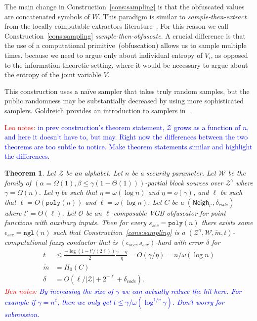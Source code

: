 \documentclass[11pt]{article}
\newcommand{\consref}[1]{\mbox{Construction~\ref{#1}}}
\newcommand{\class}[1]{{\ensuremath{\mathsf{#1}}}}
\newcommand{\neigh}{\ensuremath{\class{Neigh}}\xspace}
\newcommand{\poly}{\ensuremath{\mathtt{poly}}\xspace}
\newcommand{\ngl}{\ensuremath{\mathtt{ngl}}\xspace}
\newtheorem{theorem}{Theorem}[section]
\newcommand{\authnote}[2]{{\textcolor{red}{\textsf{#1 notes: }\textcolor{blue}{ #2}}\marginpar{\textcolor{red}{\textbf{!!!!!}}}}}
\newcommand{\authnote}[2]{}
\newcommand{\bnote}[1]{{\authnote{Ben}{#1}}}
\newcommand{\lnote}[1]{{\authnote{Leo}{#1}}}
\begin{document}
The main change in \consref{cons:sampling} is that the obfuscated values are concatenated symbols of $W$.  This paradigm is similar to \emph{sample-then-extract} from the locally computable extractors literature~\cite{lu2002hyper,vadhan2003constructing}.  For this reason we call \consref{cons:sampling} \emph{sample-then-obfuscate}.  A crucial difference is that the use of a computational primitive~(obfuscation) allows us to sample multiple times, because we need to argue only about individual entropy of $V_i$, as opposed to the information-theoretic setting, where it would be necessary to argue about the entropy of the joint variable $V$.

This construction uses a na\"{i}ve sampler that takes truly random samples, but the public randomness may be substantially decreased by using more sophisticated samplers. Goldreich provides an introduction to samplers in~\cite{goldreich2011sample}.

\lnote{in prev construction's theorem statement, $\mathcal{Z}$ grows as a function of $n$, and here it doesn't have to, but may. Right now the differences between the two theorems are too subtle to notice. Make theorem statements similar and highlight the differences.}
\begin{theorem}
\label{thm:sampling}
Let $\mathcal{Z}$ be an alphabet.
Let $n$ be a security parameter.
Let $\mathcal{W}$ be the family of $(\alpha = \Omega(1), \beta\leq \gamma(1-\Theta(1)))$-partial block sources over $\mathcal{Z}^\gamma$ where $\gamma = \Omega(n)$.   Let $\eta$ be such that $\eta = \omega(\log n)$ and $\eta = o(\gamma)$,  and $\ell$ be such that $\ell = O(\poly(n))$ and
$\ell = \omega(\log n)$.  Let $C$ be a $(\neigh_{t'}, \delta_{code})$ where $t' = \Theta(\ell)$.
Let $\mathcal{O}$ be an $\ell$-composable VGB obfuscator for point functions with auxiliary inputs. 
  Then for every $s_{sec} = \poly(n)$ there exists some $\epsilon_{sec} = \ngl(n)$ such that \consref{cons:sampling} is a $(\mathcal{Z}^\gamma, \mathcal{W}, \tilde{m}, t)$-computational fuzzy conductor that is $(\epsilon_{sec}, s_{sec})$-hard with error $\delta$ for
\begin{align*}
t&\le \frac{-\log(1-t'/(2\ell))}{2}\frac{\gamma-\eta}{\eta}  = O(\gamma/\eta) = n /\omega(\log n)\\
\tilde{m} &=H_0(C)\\
\delta &= O(\ell/|\mathcal{Z}|+2^{-\ell} +\delta_{code}).
\end{align*}
\bnote{By increasing the size of $\gamma$ we can actually reduce the hit here.  For example if $\gamma = n^c$, then we only get $t \le \gamma / \omega(\log^{1/c} \gamma)$. Don't worry for submission.}
\end{theorem}
\end{document}
